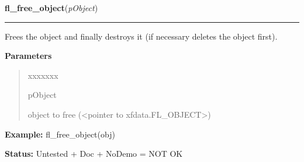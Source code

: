 \hspace{.8\funcindent}\begin{boxedminipage}{\funcwidth}

    \raggedright \textbf{fl\_free\_object}(\textit{pObject})

    \vspace{-1.5ex}

    \rule{\textwidth}{0.5\fboxrule}
\setlength{\parskip}{2ex}
    Frees the object and finally destroys it (if necessary deletes the 
    object first).

\setlength{\parskip}{1ex}
      \textbf{Parameters}
      \vspace{-1ex}

      \begin{quote}
        \begin{Ventry}{xxxxxxx}

          \item[pObject]

          object to free ({\textless}pointer to 
          xfdata.FL\_OBJECT{\textgreater})

        \end{Ventry}

      \end{quote}

\textbf{Example:} fl\_free\_object(obj)



\textbf{Status:} Untested + Doc + NoDemo = NOT OK



    \end{boxedminipage}

    \label{xformslib:library:fl_delete_object}

    \vspace{0.5ex}

